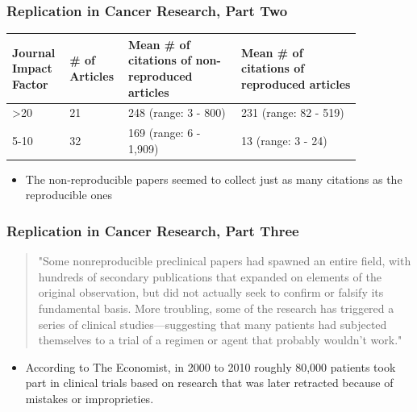 \documentclass[10pt, block=fill]{beamer}
\begin{document}
\begin{frame}
  \frametitle{Replication in Cancer Research, Part Two}
  

  \begin{tabular}{b{0.12\linewidth}b{0.12\linewidth}b{0.3\linewidth}b{0.32\linewidth}}
    \textbf{Journal Impact Factor} & \textbf{\# of Articles} & \textbf{Mean \# of citations of non-reproduced articles} & \textbf{Mean \# of citations of reproduced articles} \\ \hline
    >20 & 21 & 248 (range: 3 - 800) & 231 (range: 82 - 519) \\
    5-10 & 32 & 169 (range: 6 - 1,909) & 13 (range: 3 - 24)
  \end{tabular}

  \vspace{0.25in}
  
  \begin{itemize}
      \item The non-reproducible papers seemed to collect just as many citations as the reproducible ones
    \end{itemize}
      
\end{frame}

\begin{frame}
    \frametitle{Replication in Cancer Research, Part Three}
    \begin{quote}
         "Some nonreproducible preclinical papers had spawned an entire field, with hundreds of secondary publications that expanded on elements of the original observation, but did not actually seek to confirm or falsify its fundamental basis. More troubling, some of the research has triggered a series of clinical studies—suggesting that many patients had subjected themselves to a trial of a regimen or agent that probably wouldn't work."
    \end{quote}
    \begin{itemize}
      \item According to The Economist, in 2000 to 2010 roughly 80,000 patients took part in clinical trials based on research that was later retracted because of mistakes or improprieties.
  \end{itemize}
  
\end{frame}
\end{document}
